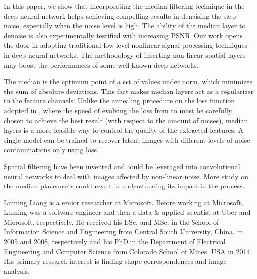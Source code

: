 \documentclass[journal]{IEEEtran}
\begin{document}
In this paper, we show that incorporating the median filtering technique in the deep neural network helps achieving compelling results in denoising the s\&p noise, especially when the noise level is high. The ability of the median layer to denoise is also experimentally testified with increasing PSNR. Our work opens the door in adopting traditional low-level nonlinear signal processing techniques in deep neural networks. The methodology of inserting non-linear spatial layers may boost the performances of some well-known deep networks.

The median is the optimum point of a set of values under  norm, which minimizes the sum of absolute deviations. This fact makes median layers act as a regularizer to the feature channels. Unlike the annealing procedure on the loss function adopted in \cite{Lehtinen2018}, where the speed of evolving the loss from  to  must be carefully chosen to achieve the best result (with respect to the amount of noises), median layers is a more feasible way to control the quality of the extracted features. A single model can be trained to recover latent images with different levels of noise contaminations only using  loss.

Spatial filtering have been invented and could be leveraged into convolutional neural networks to deal with images affected by non-linear noise. More study on the median placements could result in understanding its impact in the process.

\ifCLASSOPTIONcaptionsoff
  \newpage
\fi
















\begin{IEEEbiography}{Luming Liang}
is a senior researcher at Microsoft. Before working at Microsoft, Luming was a software engineer and then a data \& applied scientist at Uber and Microsoft, respectively. He received his BSc. and MSc. in the School of Information Science and Engineering from Central South University, China, in 2005 and 2008, respectively and his PhD in the Department of Electrical Engineering and Computer Science from Colorado School of Mines, USA in 2014. His primary research interest is finding shape correspondences and image analysis.
\end{IEEEbiography}
\end{document}
